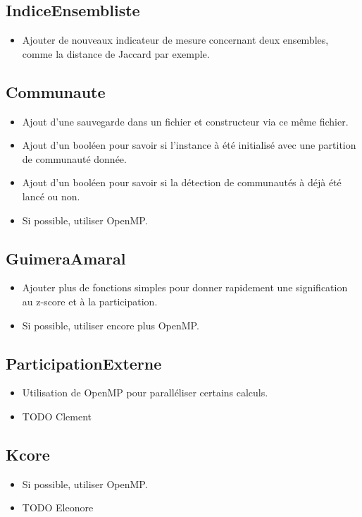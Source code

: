 \begin{titlepage}
\subsection{IndiceEnsembliste}
{
\begin{itemize}
    \item Ajouter de nouveaux indicateur de mesure concernant deux ensembles, comme la distance de Jaccard par exemple.
\end{itemize}
}

\subsection{Communaute}
{
\begin{itemize}
    \item Ajout d'une sauvegarde dans un fichier et constructeur via ce même fichier.
    \item Ajout d'un booléen pour savoir si l'instance à été initialisé avec une partition de communauté donnée.
    \item Ajout d'un booléen pour savoir si la détection de communautés à déjà été lancé ou non.
    \item Si possible, utiliser OpenMP.
\end{itemize}
}

\subsection{GuimeraAmaral}
{
\begin{itemize}
    \item Ajouter plus de fonctions simples pour donner rapidement une signification au z-score et à la participation.
    \item Si possible, utiliser encore plus OpenMP.
\end{itemize}
}

\subsection{ParticipationExterne}
{
\begin{itemize}
    \item Utilisation de OpenMP pour paralléliser certains calculs.
    \item TODO Clement
\end{itemize}
}

\subsection{Kcore}
{
\begin{itemize}
    \item Si possible, utiliser OpenMP.
    \item TODO Eleonore
\end{itemize}
}


\end{titlepage}
